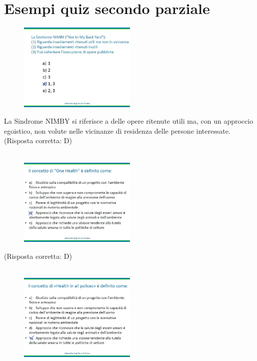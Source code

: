 \section{Esempi quiz secondo parziale}

\begin{figure}[!ht]
\centering
	\includegraphics[width=0.5\textwidth]{25/image1.jpeg}
	\end{figure}

La Sindrome NIMBY si riferisce a delle opere ritenute utili ma, con un
approccio egoistico, non volute nelle vicinanze di residenza delle
persone interessate. (Risposta corretta: D)
\\\\
\begin{figure}[!ht]
\centering
	\includegraphics[width=0.5\textwidth]{25/image2.jpeg}
	\end{figure}

(Risposta corretta: D)
\\\\
\begin{figure}[!ht]
\centering
	\includegraphics[width=0.5\textwidth]{25/image3.jpeg}
	\end{figure}

